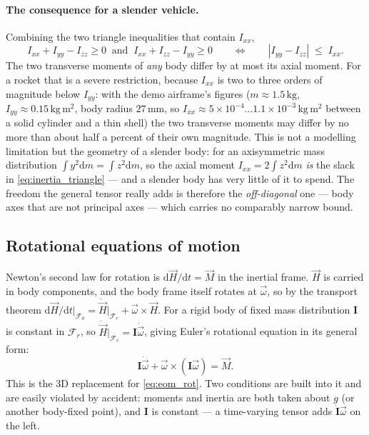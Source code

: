 \paragraph{The consequence for a slender vehicle.} Combining the two triangle inequalities that
contain $I_{xx}$,
\begin{equation} \label{eq:inertia_transverse_bound}
    I_{xx} + I_{yy} - I_{zz}\ge 0 \;\;\text{and}\;\; I_{xx} + I_{zz} - I_{yy}\ge 0
    \qquad\Longleftrightarrow\qquad
    \left\lvert I_{yy}-I_{zz}\right\rvert \;\le\; I_{xx}.
\end{equation}
The two transverse moments of \emph{any} body differ by at most its axial moment. For a rocket that
is a severe restriction, because $I_{xx}$ is two to three orders of magnitude below $I_{yy}$: with
the demo airframe's figures ($m\approx1.5\,\mathrm{kg}$, $I_{yy}\approx0.15\,\mathrm{kg\,m^2}$, body
radius $27\,\mathrm{mm}$, so $I_{xx}\approx5\times10^{-4}\ldots1.1\times10^{-3}\,\mathrm{kg\,m^2}$
between a solid cylinder and a thin shell) the two transverse moments may differ by no more than
about half a percent of their own magnitude. This is not a modelling limitation but the geometry of
a slender body: for an axisymmetric mass distribution $\int y^2\mathrm{d}m=\int z^2\mathrm{d}m$, so
the axial moment $I_{xx}=2\!\int\! z^2\mathrm{d}m$ \emph{is} the slack in
\autoref{eq:inertia_triangle} --- and a slender body has very little of it to spend. The freedom
the general tensor really adds is therefore the
\emph{off-diagonal} one --- body axes that are not principal axes --- which carries no comparably
narrow bound.

\subsection{Rotational equations of motion}\label{sec:3d_eom_rot}
Newton's second law for rotation is $\mathrm{d}\vec{H}/\mathrm{d}t=\vec{M}$ in the inertial frame.
$\vec{H}$ is carried in body components, and the body frame itself rotates at $\vec\omega$, so by
the transport theorem $\mathrm{d}\vec{H}/\mathrm{d}t\big|_{\mathcal{F}_0} = \dot{\vec{H}}
\big|_{\mathcal{F}_r} + \vec\omega\times\vec{H}$. For a rigid body of fixed mass distribution
$\mathbf{I}$ is constant in $\mathcal{F}_r$, so $\dot{\vec{H}}\big|_{\mathcal{F}_r} =
\mathbf{I}\dot{\vec\omega}$, giving Euler's rotational equation in its general form:
\begin{equation} \label{eq:eom_rot_3d}
    \mathbf{I}\dot{\vec\omega} + \vec\omega\times\left(\mathbf{I}\vec\omega\right) = \vec{M}.
\end{equation}
This is the 3D replacement for \autoref{eq:eom_rot}. Two conditions are built into it and are
easily violated by accident: moments and inertia are both taken about $g$ (or another body-fixed
point), and $\mathbf{I}$ is constant --- a time-varying tensor adds $\dot{\mathbf{I}}\vec\omega$ on
the left.

